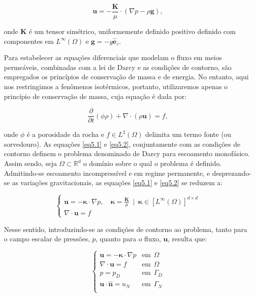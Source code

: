 \begin{equation}\label{eq5.1}
	\mathbf{u} = - \frac{\mathbf{K}}{\mu} \cdot (\nabla p - \rho \mathbf{g}),
\end{equation}

onde $\mathbf{K}$ é um tensor simétrico, uniformemente definido positivo definido com componentes em $L^{\infty}(\Omega)$  e $\mathbf{g} = -g\mathbf{\hat{e}}_{z}$. 

Para estabelecer as equações diferenciais que modelam o fluxo em meios permeáveis, combinadas com a lei de Darcy e as condições de contorno, são empregados os princípios de conservação de massa e de energia. No entanto, aqui nos restringimos a fenômenos isotérmicos, portanto, utilizaremos apenas o princípio de conservação de massa, cuja equação é dada por:

\begin{equation}\label{eq5.2}
	\dfrac{\partial }{\partial t}(\phi \rho) + \nabla \cdot (\rho \mathbf{u}) = f,
\end{equation}

onde $\phi$ é a porosidade  da rocha e $f \in L^{2}(\Omega)$ delimita um termo fonte (ou sorvedouro). As equações \ref{eq5.1} e \ref{eq5.2}, conjuntamente com as condições de contorno definem o problema denominado de Darcy para escoamento monofásico. Assim sendo, seja $\Omega \subset \mathbb{R}^{d}$ o domínio sobre o qual o problema é definido. Admitindo-se escoamento incompressível e em regime permanente, e desprezando-se as variações gravitacionais, as equações \ref{eq5.1} e \ref{eq5.2} se reduzem a:

\begin{equation}
	\begin{cases}
		\mathbf{u} = -\boldsymbol{\kappa} \cdot \nabla p, \quad \boldsymbol{\kappa} = \frac{\mathbf{K}}{\mu} \ \mid \ \boldsymbol{\kappa} \in [L^{\infty}(\Omega)]^{d \times d} \\
		\nabla \cdot \mathbf{u} = f
	\end{cases}
\end{equation}

Nesse sentido, introduzindo-se as condições de contorno ao problema, tanto para o campo escalar de pressões, $p$, quanto para o fluxo, $\mathbf{u}$, resulta que:

\begin{equation}\label{eq5.4}
	\begin{cases}
		\mathbf{u}= -\boldsymbol{\kappa} \cdot \nabla{p} & \text{em}~~\Omega \\
		\nabla \cdot \mathbf{u} = f & \text{em}~~\Omega \\
		p = p_D & \text{em}~~\Gamma_D \\
		\mathbf{u} \cdot \hat{\mathbf{n}} = u_N & \text{em}~~\Gamma_N \\
	\end{cases}
\end{equation}


